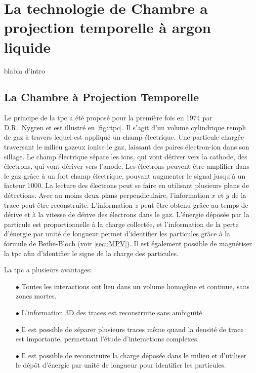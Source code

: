 
\chapter{La technologie de Chambre a projection temporelle à argon liquide}

  blabla d'intro
    
  \section{La Chambre à Projection Temporelle}
    Le principe de la \acrfull{tpc} a été proposé pour la première fois en 1974 par D.R.~Nygren\cite{Nygren1974} et est illustré en \autoref{fig::tpc}. Il s'agit d'un volume cylindrique rempli de gaz à travers lequel est appliqué un champ électrique. Une particule chargée traversant le milieu gazeux ionise le gaz, laissant des paires électron-ion dans son sillage. Le champ électrique sépare les ions, qui vont dériver vers la cathode, des électrons, qui vont dériver vers l'anode. Les électrons peuvent être amplifier dans le gaz grâce à un fort champ électrique, pouvant augmenter le signal jusqu'à un facteur 1000. La lecture des électrons peut se faire en utilisant plusieurs plans de détections. Avec au moins deux plans perpendiculaire, l'information $x$ et $y$ de la trace peut être reconstruite. L'information $z$ peut être obtenu grâce au temps de dérive et à la vitesse de dérive des électrons dans le gaz. L'énergie déposée par la particule est proportionnelle à la charge collectée, et l'information de la perte d'énergie par unité de longueur permet d'identifier les particules grâce à la formule de Bethe-Bloch (voir \autoref{sec::MPV}). Il est également possible de magnétiser la \gls{tpc} afin d'identifier le signe de la charge des particules.

    La \gls{tpc} a plusieurs avantages:
    \begin{itemize}
      \item[$\bullet$] Toutes les interactions ont lieu dans un volume homogène et continue, sans zones mortes.
      \item[$\bullet$] L'information 3D des traces est reconstruite sans ambiguïté.
      \item[$\bullet$] Il est possible de séparer plusieurs traces même quand la densité de trace est importante, permettant l'étude d'interactions complexes.
      \item[$\bullet$] Il est possible de reconstruire la charge déposée dans le milieu et d'utiliser le dépôt d'énergie par unité de longueur pour identifier les particules.
    \end{itemize}
    
